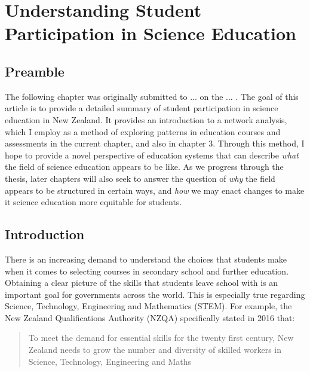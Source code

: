 \chapter{Understanding Student Participation in Science Education}

\section{Preamble}
The following chapter was originally submitted to ... on the ... . The goal of this article is to provide a detailed summary of student participation in science education in New Zealand. It provides an introduction to a network analysis, which I employ as a method of exploring patterns in education courses and assessments in the current chapter, and also in chapter 3. Through this method, I hope to provide a novel perspective of education systems that can describe \textit{what} the field of science education appears to be like. As we progress through the thesis, later chapters will also seek to answer the question of \textit{why} the field appears to be structured in certain ways, and \textit{how} we may enact changes to make it science education more equitable for students.

\section{Introduction}
There is an increasing demand to understand the choices that students make when it comes to selecting courses in secondary school and further education. Obtaining a clear picture of the skills that students leave school with is an important goal for governments across the world. This is especially true regarding Science, Technology, Engineering and Mathematics (STEM). For example, the New Zealand Qualifications Authority (NZQA) \citep[p.8]{NZQA2016} specifically stated in 2016 that:

\begin{quote}
    To meet the demand for essential skills for the twenty first century, New Zealand needs to grow the number and diversity of skilled workers in Science, Technology, Engineering and Maths
\end{quote}  

